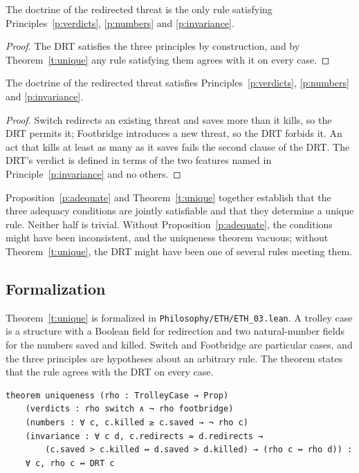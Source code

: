 \documentclass{situationist-preprint}
\begin{document}
\begin{corollary}\label{c:only}
The doctrine of the redirected threat is the only rule satisfying Principles~\ref{p:verdicts}, \ref{p:numbers} and \ref{p:invariance}.
\end{corollary}

\begin{proof}
The DRT satisfies the three principles by construction, and by Theorem~\ref{t:unique} any rule satisfying them agrees with it on every case.
\end{proof}

\begin{proposition}\label{p:adequate}
The doctrine of the redirected threat satisfies Principles~\ref{p:verdicts}, \ref{p:numbers} and \ref{p:invariance}.
\end{proposition}

\begin{proof}
Switch redirects an existing threat and saves more than it kills, so the DRT permits it; Footbridge introduces a new threat, so the DRT forbids it. An act that kills at least as many as it saves fails the second clause of the DRT. The DRT's verdict is defined in terms of the two features named in Principle~\ref{p:invariance} and no others.
\end{proof}

Proposition~\ref{p:adequate} and Theorem~\ref{t:unique} together establish that the three adequacy conditions are jointly satisfiable and that they determine a unique rule. Neither half is trivial. Without Proposition~\ref{p:adequate}, the conditions might have been inconsistent, and the uniqueness theorem vacuous; without Theorem~\ref{t:unique}, the DRT might have been one of several rules meeting them.

\subsection{Formalization}

Theorem~\ref{t:unique} is formalized in \nolinkurl{Philosophy/ETH/ETH_03.lean}. A trolley case is a structure with a Boolean field for redirection and two natural-number fields for the numbers saved and killed. Switch and Footbridge are particular cases, and the three principles are hypotheses about an arbitrary rule. The theorem states that the rule agrees with the DRT on every case.

\begin{lstlisting}
theorem uniqueness (rho : TrolleyCase → Prop)
    (verdicts : rho switch ∧ ¬ rho footbridge)
    (numbers : ∀ c, c.killed ≥ c.saved → ¬ rho c)
    (invariance : ∀ c d, c.redirects = d.redirects →
        (c.saved > c.killed ↔ d.saved > d.killed) → (rho c ↔ rho d)) :
    ∀ c, rho c ↔ DRT c
\end{lstlisting}
\end{document}
